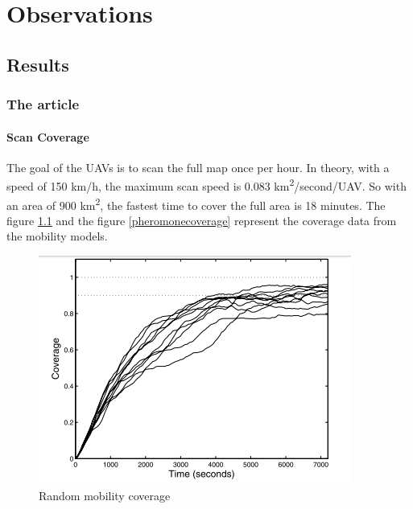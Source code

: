 \part{Observations}
\setcounter{chapter}{0}
\chapter{Results}

\section{The article}

\subsection{Scan Coverage}

The goal of the UAVs is to scan the full map once per hour. In theory, with a speed of 150 km/h, the maximum scan speed is 0.083 km\textsuperscript{2}/second/UAV. So with an area of 900 km\textsuperscript{2}, the fastest time to cover the full area is 18 minutes. The figure \ref{randomcoverage} and the figure \ref{pheromonecoverage} represent the coverage data from the mobility models.

\begin{figure}[h]
\centering
   \includegraphics{../images/random_coverage.png}
   \caption{\label{randomcoverage} Random mobility coverage\cite{UAV}}
\end{figure}

\newpage

